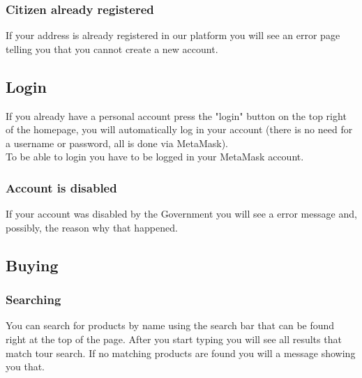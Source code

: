 	\subsubsection{Citizen already registered}
	If your address is already registered in our platform you will see an
	error page telling you that you cannot create a new account.
	
	\subsection{Login}
	If you already have a personal account press the "login" button on the 
	top right of the homepage, you will automatically log in your account 
	(there is no need for a username or password, all is done via MetaMask). 
	\\To be able to login you have to be logged in your MetaMask account.
	\subsubsection{Account is disabled}
	If your account was disabled by the Government you will see a error 
	message and, possibly, the reason why that happened.
	
	\subsection{Buying}
	\subsubsection{Searching}
	You can search for products by name using the search bar that can be found 
	right at the top of the page. After you start typing you will see all 
	results that match tour search. If no matching products are found you will 
	a message showing you that.
